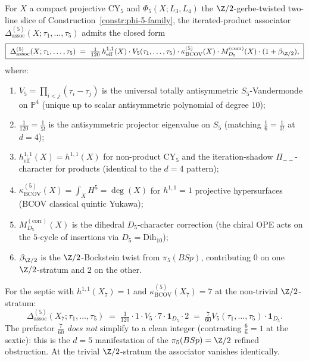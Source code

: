 \begin{conjecture}[\texorpdfstring{$d = 5$}{d = 5} closed-form iterated-product associator]
\label{conj:cy5-phi-5-associator-septic}
\ClaimStatusConjectured
{}%
%
For $X$ a compact projective CY${}_5$ and \(\Phi_5(X;L_3,L_4)\) the
\(\Z/2\)-gerbe-twisted two-line slice of
Construction~\ref{constr:phi-5-family}, the iterated-product associator
$\Delta_{\mathrm{assoc}}^{(5)}(X; \tau_1, \ldots, \tau_5)$ admits the closed form
\begin{equation}
\label{eq:cy5-associator-closed-form}
\boxed{\;
\Delta_{\mathrm{assoc}}^{(5)}(X; \tau_1, \ldots, \tau_5) \;=\; \tfrac{1}{120}\,
h^{1,1}_{\mathrm{eff}}(X) \cdot V_5(\tau_1, \ldots, \tau_5) \cdot
\kappa_{\mathrm{BCOV}}^{(5)}(X) \cdot M^{(\mathrm{corr})}_{D_5}(X) \cdot (1 + \beta_{\Z/2}),
\;}
\end{equation}
where:
\begin{enumerate}[label=\textup{(}\roman*\textup{)}]
 \item $V_5 = \prod_{i < j}(\tau_i - \tau_j)$ is the universal totally
 antisymmetric $S_5$-Vandermonde on $\mathbb{P}^4$ \textup{(}unique up to scalar
 antisymmetric polynomial of degree $10$\textup{)};
 \item $\tfrac{1}{120} = \tfrac{1}{5!}$ is the antisymmetric projector
 eigenvalue on $S_5$ \textup{(}matching $\tfrac{1}{6} = \tfrac{1}{3!}$ at
 $d = 4$\textup{)};
 \item $h^{1,1}_{\mathrm{eff}}(X) = h^{1,1}(X)$ for non-product CY${}_5$ and
 the iteration-shadow $\Pi_{--}$-character for products \textup{(}identical to
 the $d = 4$ pattern\textup{)};
 \item $\kappa_{\mathrm{BCOV}}^{(5)}(X) = \int_X H^5 = \deg(X)$ for $h^{1,1} = 1$ projective
 hypersurfaces \textup{(}BCOV classical quintic Yukawa\textup{)};
 \item $M^{(\mathrm{corr})}_{D_5}(X)$ is the dihedral $D_5$-character
 correction \textup{(}the chiral OPE acts on the $5$-cycle of insertions via
 $D_5 = \mathrm{Dih}_{10}$\textup{)};
 \item $\beta_{\Z/2}$ is the $\Z/2$-Bockstein twist from $\pi_5(BSp)$,
 contributing $0$ on one $\Z/2$-stratum and $2$ on the other.
\end{enumerate}
\end{conjecture}

\begin{example}
\label{ex:septic-cy5-associator}
For the septic with $h^{1,1}(X_7) = 1$ and $\kappa_{\mathrm{BCOV}}^{(5)}(X_7) = 7$ at the
non-trivial $\Z/2$-stratum:
\[
 \Delta_{\mathrm{assoc}}^{(5)}(X_7; \tau_1, \ldots, \tau_5) \;=\; \tfrac{1}{120}
 \cdot 1 \cdot V_5 \cdot 7 \cdot \mathbf{1}_{D_5} \cdot 2 \;=\; \tfrac{7}{60}
 V_5(\tau_1, \ldots, \tau_5) \cdot \mathbf{1}_{D_5}.
\]
The prefactor $\tfrac{7}{60}$ \emph{does not} simplify to a clean integer
\textup{(}contrasting $\tfrac{6}{6} = 1$ at the sextic\textup{)}: this is the
$d = 5$ manifestation of the $\pi_5(BSp) = \Z/2$ refined obstruction. At the
trivial $\Z/2$-stratum the associator vanishes identically.
\end{example}

